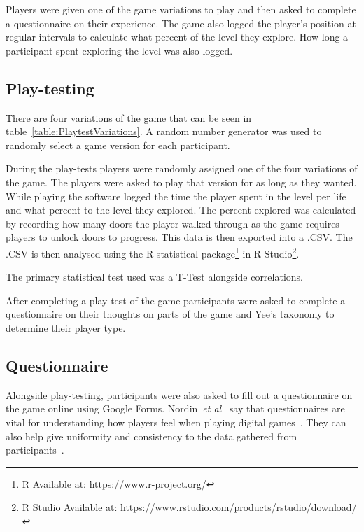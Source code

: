 \documentclass[journal]{IEEEtran}
\begin{document}
	Players were given one of the game variations to play and then asked to complete a questionnaire on their experience. The game also logged the player's position at regular intervals to calculate what percent of the level they explore. How long a participant spent exploring the level was also logged.
	
	\subsection{Play-testing}
	There are four variations of the game that can be seen in table~\ref{table:PlaytestVariations}.  A random number generator was used to randomly select a game version for each participant.
	
	
	During the play-tests players were randomly assigned one of the four variations of the game. The players were asked to play that version for as long as they wanted. While playing the software logged the time the player spent in the level per life and what percent to the level they explored. The percent explored was calculated by recording how many doors the player walked through as the game requires players to unlock doors to progress. This data is then exported into a .CSV. The .CSV is then analysed using the R statistical package\footnote[2]{R Available at: https://www.r-project.org/} in R Studio\footnote[3]{R Studio Available at: https://www.rstudio.com/products/rstudio/download/}.
	
	
	The primary statistical test used was a T-Test alongside correlations.
	
	After completing a play-test of the game participants were asked to complete a questionnaire on their thoughts on parts of the game and Yee's taxonomy to determine their player type.
	
	\subsection{Questionnaire} \label{Questionnaire}
	
	Alongside play-testing, participants were also asked to fill out a questionnaire on the game online using Google Forms. Nordin~\textit{et al}~\cite{nordin2014} say that questionnaires are vital for understanding how players feel when playing digital games~\cite{nordin2014,Denisova2016}. They can also help give uniformity and consistency to the data gathered from participants~\cite{Denisova2016}.
	
\end{document}
